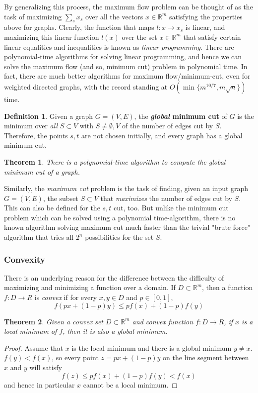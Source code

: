 \documentclass[a4paper, 12pt]{report}
\newtheorem{theorem}{Theorem}[section]
\theoremstyle{remark}
\theoremstyle{definition}
\newtheorem{definition}{Definition}[section]
\begin{document}
By generalizing this process, the maximum flow problem can be thought of as the task of maximizing $\sum_s x_s$ over all the vectors $x \in \mathbb{R}^m$ satisfying the properties above for graphs. Clearly, the function that maps $l: x \rightarrow x_s$ is linear, and maximizing this linear function $l(x)$ over the set $x \in \mathbb{R}^m$ that satisfy certain linear equalities and inequalities is known as \textit{linear programming}. There are polynomial-time algorithms for solving linear programming, and hence we can solve the maximum flow (and so, minimum cut) problem in polynomial time. In fact, there are much better algorithms for maximum flow/minimum-cut, even for weighted directed graphs, with the record standing at $O(\min\{m^{10/7}, m\sqrt{n}\})$ time. 

\begin{definition}
Given a graph $G = (V, E)$, the \textbf{\textit{global} minimum cut} of $G$ is the minimum over \textit{all} $S \subset V$ with $S \neq \emptyset, V$ of the number of edges cut by $S$. Therefore, the points $s, t$ are not chosen initially, and every graph has a global minimum cut. 
\end{definition}

\begin{theorem}
There is a polynomial-time algorithm to compute the global minimum cut of a graph. 
\end{theorem}

Similarly, the \textit{maximum cut} problem is the task of finding, given an input graph $G = (V, E)$, the subset $S \subset V$ that \textit{maximizes} the number of edges cut by $S$. This can also be defined for the $s, t$ cut, too. But unlike the minimum cut problem which can be solved using a polynomial time-algorithm, there is no known algorithm solving maximum cut much faster than the trivial "brute force" algorithm that tries all $2^n$ possibilities for the set $S$. 

\subsubsection{Convexity}
There is an underlying reason for the difference between the difficulty of maximizing and minimizing a function over a domain. If $D \subset \mathbb{R}^m$, then a function $f: D \longrightarrow R$ is \textit{convex} if for every $x, y \in D$ and $p \in [0,1]$, 
\[f(px + (1-p)y) \leq p f(x) + (1-p) f(y)\]

\begin{theorem}
Given a convex set $D \subset \mathbb{R}^m$ and convex function $f: D \longrightarrow R$, if $x$ is a local minimum of $f$, then it is also a global minimum. 
\end{theorem}
\begin{proof}
Assume that $x$ is the local minimum and there is a global minimum $y \neq x$. $f(y) < f(x)$, so every point $z = px + (1-p) y$ on the line segment between $x$ and $y$ will satisfy 
\[f(z) \leq p f(x) + (1-p) f(y) < f(x)\]
and hence in particular $x$ cannot be a local minimum. 
\end{proof}
\end{document}
